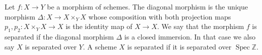 Let $f: X \rightarrow Y$ be a morphism of schemes. The diagonal morphism is the unique morphism $\Delta: X \rightarrow X \times_Y X$ whose composition with both projection maps $p_1, p_2: X \times_Y X \rightarrow X$ is the identity map of $X \rightarrow X$. We say that the morphism $f$ is separated if the diagonal morphism $\Delta$ is a closed immersion. In that case we also say $X$ is separated over $Y$. A scheme $X$ is separated if it is separated over $\operatorname{Spec} \mathbb{Z}$.

